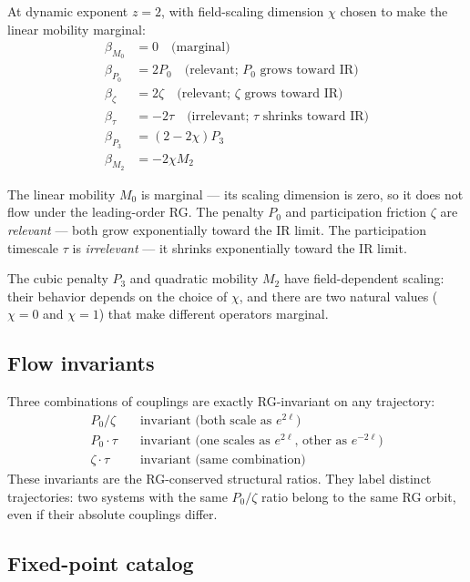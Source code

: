 \documentclass[11pt,a4paper]{article}
\begin{document}
At dynamic exponent $z = 2$, with field-scaling dimension $\chi$ chosen to make the linear mobility marginal:
\[
\begin{aligned}
\beta_{M_0} &= 0 \quad \text{(marginal)} \\
\beta_{P_0} &= 2 P_0 \quad \text{(relevant; $P_0$ grows toward IR)} \\
\beta_\zeta &= 2 \zeta \quad \text{(relevant; $\zeta$ grows toward IR)} \\
\beta_\tau &= -2 \tau \quad \text{(irrelevant; $\tau$ shrinks toward IR)} \\
\beta_{P_3} &= (2 - 2\chi) P_3 \\
\beta_{M_2} &= -2\chi M_2
\end{aligned}
\]

The linear mobility $M_0$ is marginal --- its scaling dimension is zero, so it does not flow under the leading-order RG. The penalty $P_0$ and participation friction $\zeta$ are \emph{relevant} --- both grow exponentially toward the IR limit. The participation timescale $\tau$ is \emph{irrelevant} --- it shrinks exponentially toward the IR limit.

The cubic penalty $P_3$ and quadratic mobility $M_2$ have field-dependent scaling: their behavior depends on the choice of $\chi$, and there are two natural values ($\chi = 0$ and $\chi = 1$) that make different operators marginal.

\subsection{Flow invariants}

Three combinations of couplings are exactly RG-invariant on any trajectory:
\[
\begin{aligned}
P_0/\zeta &\quad \text{invariant (both scale as } e^{2\ell}\text{)} \\
P_0 \cdot \tau &\quad \text{invariant (one scales as } e^{2\ell}\text{, other as } e^{-2\ell}\text{)} \\
\zeta \cdot \tau &\quad \text{invariant (same combination)}
\end{aligned}
\]
These invariants are the RG-conserved structural ratios. They label distinct trajectories: two systems with the same $P_0/\zeta$ ratio belong to the same RG orbit, even if their absolute couplings differ.

\subsection{Fixed-point catalog}
\end{document}
